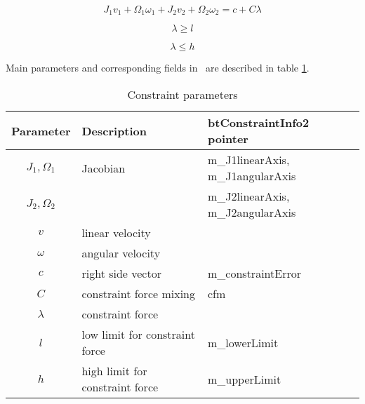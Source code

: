 \begin{equation} \label{eq:constraintEquation}
J_1 v_1 + \Omega_1 \omega_1 + J_2 v_2 + \Omega_2 \omega_2 = c + C \lambda
\end{equation}

\begin{equation} \label{eq:lambdaLow}
\lambda \geq l
\end{equation}

\begin{equation} \label{eq:lambdaHigh}
\lambda \leq h
\end{equation}

Main parameters  and corresponding fields in \bullet\  
 are described in table \ref{tab:constraintParameters}.

\begin {table}[htb!]
\begin{center}
\begin{tabular}{|c| l| l|}
\hline
{\bf Parameter} & {\bf Description} & {\bf btConstraintInfo2 pointer}\\  \hline
$J_1, \Omega_1$ & Jacobian & m\_J1linearAxis, m\_J1angularAxis \\ 
$J_2, \Omega_2$ & & m\_J2linearAxis, m\_J2angularAxis \\ \hline
$v$ & linear velocity & \\ \hline
$\omega$ & angular velocity & \\ \hline
$c$        &  right side vector   & m\_constraintError \\ \hline
$C$  & constraint force mixing & cfm \\  \hline
$\lambda$ & constraint force &  \\ \hline
$l$ & low limit for constraint force & m\_lowerLimit \\ \hline
$h$ & high limit for constraint force & m\_upperLimit \\ \hline
\end {tabular}
\end{center}
\caption {Constraint parameters} \label{tab:constraintParameters} 
\end {table}
